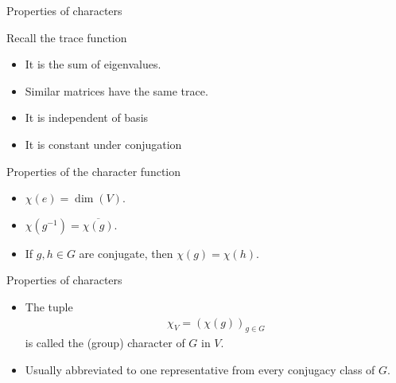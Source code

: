 \documentclass[10pt]{beamer}
\begin{document}
	\begin{frame}{Properties of characters}
		\begin{block}{Recall the trace function}
			\begin{itemize}
				\item It is the sum of eigenvalues.
				
				\item Similar matrices have the same trace.
				
				\item It is independent of basis
				
				\item It is constant under conjugation
			\end{itemize}
		\end{block}\pause
		\begin{block}{Properties of the character function}\pause
			\begin{itemize}
				
				\item $\chi(e) = \dim(V)$.\pause
				
				\item $\chi(g^{-1}) = \overline{\chi(g)}$.\pause
				
				\item If $g,h \in G$ are conjugate, then $\chi(g) = \chi(h)$.
				
			\end{itemize}
		\end{block}
	\end{frame}
	\begin{frame}{Properties of characters}
		\begin{definition}
			\begin{itemize}
				\item The tuple
			\begin{align*}
				\chi_V = \left(\chi(g)\right)_{g \in G}
			\end{align*}
			is called the \alert{(group) character} of $G$ in $V$.\pause
			
				\item Usually abbreviated to one representative from every conjugacy class of $G$.
			\end{itemize}
		\end{definition}
	\end{frame}
\end{document}
